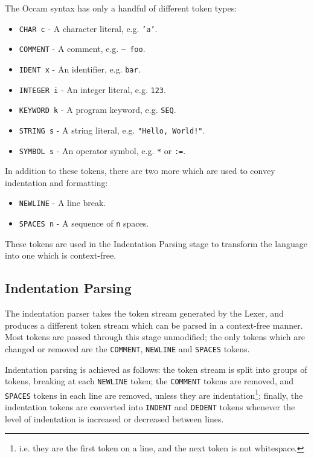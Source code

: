 The Occam syntax has only a handful of different token types:
\begin{itemize}
  \item \texttt{CHAR c} - A character literal, e.g. \texttt{'a'}.
  \item \texttt{COMMENT} - A comment, e.g. \texttt{-- foo}.
  \item \texttt{IDENT x} - An identifier, e.g. \texttt{bar}.
  \item \texttt{INTEGER i} - An integer literal, e.g. \texttt{123}.
  \item \texttt{KEYWORD k} - A program keyword, e.g. \texttt{SEQ}.
  \item \texttt{STRING s} - A string literal, e.g. \texttt{"Hello, World!"}.
  \item \texttt{SYMBOL s} - An operator symbol, e.g. \texttt{*} or \texttt{:=}.
\end{itemize}
In addition to these tokens, there are two more which are used to convey
indentation and formatting:
\begin{itemize}
  \item \texttt{NEWLINE} - A line break.
  \item \texttt{SPACES n} - A sequence of \texttt{n} spaces.
\end{itemize}
These tokens are used in the Indentation Parsing stage to transform the language
into one which is context-free.

\subsection{Indentation Parsing}

The indentation parser takes the token stream generated by the Lexer, and
produces a different token stream which can be parsed in a context-free manner.
Most tokens are passed through this stage unmodified; the only tokens which are
changed or removed are the \texttt{COMMENT}, \texttt{NEWLINE} and
\texttt{SPACES} tokens.

Indentation parsing is achieved as follows: the token stream is split into
groups of tokens, breaking at each \texttt{NEWLINE} token; the \texttt{COMMENT}
tokens are removed, and \texttt{SPACES} tokens in each line are removed, unless
they are indentation\footnote{i.e. they are the first token on a line, and the
next token is not whitespace.}; finally, the indentation tokens are converted
into \texttt{INDENT} and \texttt{DEDENT} tokens whenever the level of
indentation is increased or decreased between lines.

